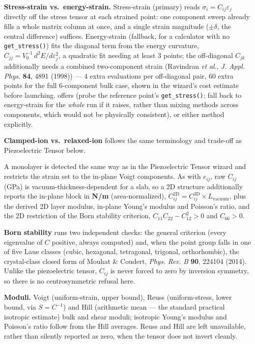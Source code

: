 \textbf{Stress-strain vs.\ energy-strain.} Stress-strain (primary) reads
$\sigma_i = C_{ij}\varepsilon_j$ directly off the stress tensor at each
strained point: one component sweep already fills a whole matrix column at
once, and a single strain magnitude ($\pm\delta$, the central difference)
suffices. Energy-strain (fallback, for a calculator with no
\texttt{get\_stress()}) fits the diagonal term from the energy curvature,
$C_{jj} = V_0^{-1}\,d^2E/d\varepsilon_j^2$, a quadratic fit needing at
least 3 points; the off-diagonal $C_{jk}$ additionally needs a combined
two-component strain (Ravindran \emph{et al.}, \emph{J. Appl. Phys.}
\textbf{84}, 4891 (1998)) --- 4 extra evaluations per off-diagonal pair, 60
extra points for the full 6-component bulk case, shown in the wizard's cost
estimate before launching.  offers  (probe the
reference point's \texttt{get\_stress()}; fall back to energy-strain for
the \emph{whole} run if it raises, rather than mixing methods across
components, which would not be physically consistent), or either method
explicitly.

\textbf{Clamped-ion vs.\ relaxed-ion} follows the same terminology and
trade-off as Piezoelectric Tensor below.

A monolayer is detected the same way as in the Piezoelectric Tensor wizard
and restricts the strain set to the in-plane Voigt components. As with
$e_{ij}$, raw $C_{ij}$ (GPa) is vacuum-thickness-dependent for a slab, so a
2D structure additionally reports the in-plane block in \textbf{N/m}
(area-normalized), $C_{ij}^\text{2D} = C_{ij}^\text{3D} \times L_\text{vacuum}$,
plus the derived 2D layer modulus, in-plane Young's modulus and Poisson's
ratio, and the 2D restriction of the Born stability criterion,
$C_{11}C_{22}-C_{12}^2 > 0$ and $C_{66} > 0$.

\textbf{Born stability} runs two independent checks: the general criterion
(every eigenvalue of $C$ positive, always computed) and, when the point
group falls in one of five Laue classes (cubic, hexagonal, tetragonal,
trigonal, orthorhombic), the crystal-class closed form of Mouhat \&
Coudert, \emph{Phys. Rev. B} \textbf{90}, 224104 (2014). Unlike the
piezoelectric tensor, $C_{ij}$ is never forced to zero by inversion
symmetry, so there is no centrosymmetric refusal here.

\textbf{Moduli.} Voigt (uniform-strain, upper bound), Reuss
(uniform-stress, lower bound, via $S = C^{-1}$) and Hill (arithmetic mean
--- the standard practical isotropic estimate) bulk and shear moduli;
isotropic Young's modulus and Poisson's ratio follow from the Hill
averages. Reuss and Hill are left unavailable, rather than silently
reported as zero, when the tensor does not invert cleanly.

